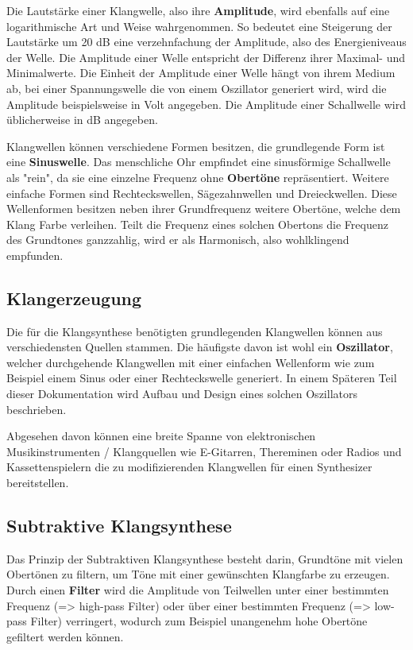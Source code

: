Die Lautstärke einer Klangwelle, also ihre \textbf{Amplitude}, wird ebenfalls auf eine logarithmische Art und Weise wahrgenommen. So bedeutet eine Steigerung der Lautstärke um 20 \si{\dB} eine verzehnfachung der Amplitude, also des Energieniveaus der Welle. Die Amplitude einer Welle entspricht der Differenz ihrer Maximal- und Minimalwerte. Die Einheit der Amplitude einer Welle hängt von ihrem Medium ab, bei einer Spannungswelle die von einem Oszillator generiert wird, wird die Amplitude beispielsweise in Volt angegeben. Die Amplitude einer Schallwelle wird üblicherweise in \si{\dB} angegeben.

Klangwellen können verschiedene Formen besitzen, die grundlegende Form ist eine \textbf{Sinuswelle}. Das menschliche Ohr empfindet eine sinusförmige Schallwelle als "rein", da sie eine einzelne Frequenz ohne \textbf{Obertöne} repräsentiert. Weitere einfache Formen sind Rechteckswellen, Sägezahnwellen und Dreieckwellen. Diese Wellenformen besitzen neben ihrer Grundfrequenz weitere Obertöne, welche dem Klang Farbe verleihen. Teilt die Frequenz eines solchen Obertons die Frequenz des Grundtones ganzzahlig, wird er als Harmonisch, also wohlklingend empfunden.

\subsection{Klangerzeugung}
\label{sec:orgf2d3d5e}
Die für die Klangsynthese benötigten grundlegenden Klangwellen können aus verschiedensten Quellen stammen. Die häufigste davon ist wohl ein \textbf{Oszillator}, welcher durchgehende Klangwellen mit einer einfachen Wellenform wie zum Beispiel einem Sinus oder einer Rechteckswelle generiert. In einem Späteren Teil dieser Dokumentation wird Aufbau und Design eines solchen Oszillators beschrieben.

Abgesehen davon können eine breite Spanne von elektronischen Musikinstrumenten / Klangquellen wie E-Gitarren, Thereminen oder Radios und Kassettenspielern die zu modifizierenden Klangwellen für einen Synthesizer bereitstellen.

\subsection{Subtraktive Klangsynthese}
\label{sec:org2bb1e5d}
Das Prinzip der Subtraktiven Klangsynthese besteht darin, Grundtöne mit vielen Obertönen zu filtern, um Töne mit einer gewünschten Klangfarbe zu erzeugen. Durch einen \textbf{Filter} wird die Amplitude von Teilwellen unter einer bestimmten Frequenz (=> high-pass Filter) oder über einer bestimmten Frequenz (=> low-pass Filter) verringert, wodurch zum Beispiel unangenehm hohe Obertöne gefiltert werden können.

